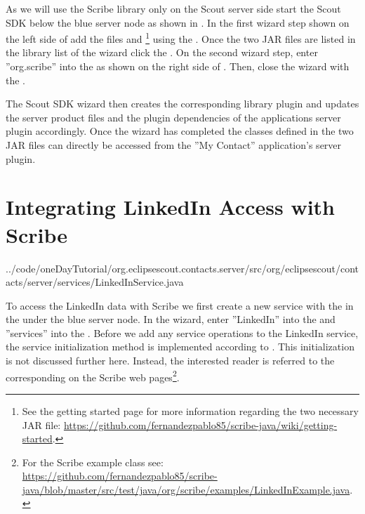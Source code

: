 \documentclass[a4paper,10pt,twoside]{book}
\begin{document}
As we will use the Scribe library only on the Scout server side start the Scout SDK  below the blue server node as shown in . 
In the first wizard step shown on the left side of  add the files  and \footnote{
See the getting started page for more information regarding the two necessary JAR file: \url{https://github.com/fernandezpablo85/scribe-java/wiki/getting-started}.
} 
using the . 
Once the two JAR files are listed in the library list of the wizard click the .
On the second wizard step, enter ''org.scribe'' into the  as shown on the right side of . 
Then, close the wizard with the .

The Scout SDK wizard then creates the corresponding library plugin and updates the server product files and the plugin dependencies of the applications server plugin accordingly. 
Once the wizard has completed the classes defined in the two JAR files can directly be accessed from the ''My Contact'' application's server plugin.

\section{Integrating LinkedIn Access with Scribe}


{../code/oneDayTutorial/org.eclipsescout.contacts.server/src/org/eclipsescout/contacts/server/services/LinkedInService.java}

To access the LinkedIn data with Scribe we first create a new service  with the  in the  under the blue server node. 
In the wizard, enter ''LinkedIn'' into the  and ''services'' into the . 
Before we add any service operations to the LinkedIn service, the service initialization method is implemented according to . 
This initialization is not discussed further here.
Instead, the interested reader is referred to the corresponding  on the Scribe web pages\footnote{
For the Scribe  example class see: \url{https://github.com/fernandezpablo85/scribe-java/blob/master/src/test/java/org/scribe/examples/LinkedInExample.java}.
}.
\end{document}
